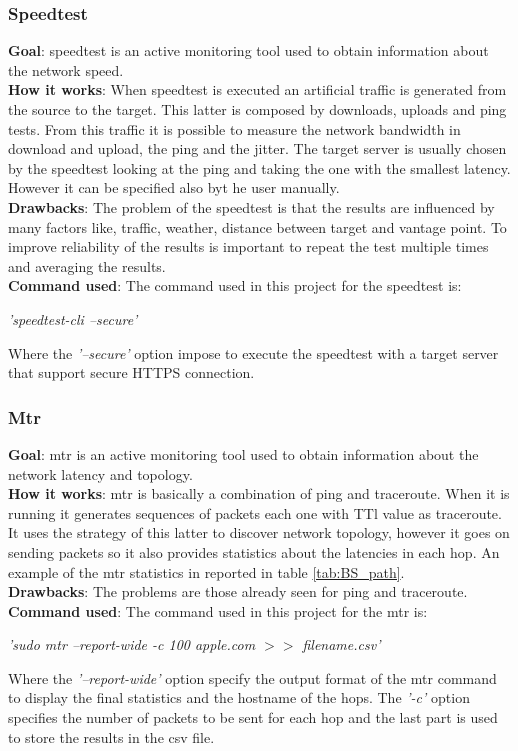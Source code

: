 \documentclass[a4paper,10pt]{article}
\begin{document}
\begin{multicols}{2}
\subsubsection*{Speedtest}
\small\textbf{Goal}: speedtest is an active monitoring tool used to obtain information about the network speed.\\
\small\textbf{How it works}: When speedtest is executed an artificial traffic is generated from the source to the target. This latter is composed by 
downloads, uploads and ping tests. From this traffic it is possible to measure the network bandwidth in download and upload, the ping and the jitter.
The target server is usually chosen by the speedtest looking at the ping and taking the one with the smallest latency. However it can be specified also 
byt he user manually.\\
\small\textbf{Drawbacks}: The problem of the speedtest is that the results are influenced by many factors like, traffic, weather, distance between target and
vantage point. To improve reliability of the results is important to repeat the test multiple times and averaging the results.\\
\small\textbf{Command used}: The command used in this project for the speedtest is: 
\begin{center}\textit{'speedtest-cli  --secure'} \end{center}
Where the \textit{'--secure'} option impose to execute the speedtest with a target server that support secure HTTPS connection.


\subsubsection*{Mtr}
\small\textbf{Goal}: mtr is an active monitoring tool used to obtain information about the network latency and topology.\\
\small\textbf{How it works}: mtr is basically a combination of ping and traceroute. When it is running it generates sequences of packets each one with
TTl value as traceroute. It uses the strategy of this latter to discover network topology, however it goes on sending packets so it also provides
statistics about the latencies in each hop. An example of the mtr statistics in reported in table \ref{tab:BS_path}.\\
\small\textbf{Drawbacks}: The problems are those already seen for ping and traceroute.\\
\small\textbf{Command used}: The command used in this project for the mtr is: 
\begin{center}\textit{'sudo  mtr  --report-wide  -c 100  apple.com  \(>>\)  filename.csv'} \end{center}
Where the \textit{'--report-wide'} option specify the output format of the mtr command to display the final statistics and the hostname of the hops. The 
\textit{'-c'} option specifies the number of packets to be sent for each hop and the last part is used to store the results in the csv file.


\end{multicols}
\end{document}
